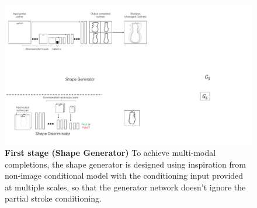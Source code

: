 \begin{figure}[t]
    \centering
    \includegraphics[width=\linewidth]{paper_images/shapegen.pdf}
    \vspace{-8mm}
    \caption{\textbf{First stage (Shape Generator)} To achieve multi-modal completions, the shape generator is designed using inspiration from non-image conditional model \cite{mescheder2018training} with the conditioning input provided at multiple scales, so that the generator network doesn't ignore the partial stroke conditioning.
    }\label{fig:SketchNet}
\end{figure}

\label{sec:methods}




